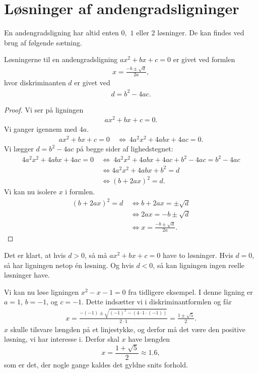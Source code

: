 \section*{Løsninger af andengradsligninger}
En andengradsligning har altid enten $0,$ $1$ eller $2$ løsninger. De kan findes ved brug af følgende sætning.
\begin{setn}
Løsningerne til en andengradsligning $ax^2+bx+c=0$ er givet ved formlen
\begin{align*}
x = \frac{-b\pm \sqrt{d}}{2a},
\end{align*}
hvor diskriminanten $d$ er givet ved
\begin{align*}
d=b^2-4ac.
\end{align*}
\end{setn}
\begin{proof}
Vi ser på ligningen
\begin{align*}
ax^2+bx+c = 0.
\end{align*}
Vi ganger igennem med $4a$.
\begin{align*}
ax^2+bx+c = 0\ &\Leftrightarrow \ 4a^2x^2+4abx+4ac=0.
\end{align*}
Vi lægger $d = b^2-4ac$ på begge sider af lighedstegnet:
\begin{align*}
4a^2x^2+4abx+4ac=0 \ &\Leftrightarrow \ 4a^2x^2+4abx+4ac + b^2-4ac=b^2-4ac\\
&\Leftrightarrow 4a^2x^2+4abx+b^2 = d\\
&\Leftrightarrow (b+2ax)^2 = d.
\end{align*}
Vi kan nu isolere $x$ i formlen.
\begin{align*}
(b+2ax)^2 = d \ &\Leftrightarrow b+2ax = \pm \sqrt{d}\\
&\Leftrightarrow 2ax = -b \pm \sqrt{d}\\
&\Leftrightarrow x = \frac{-b\pm \sqrt{d}}{2a}.
\end{align*}
\end{proof}
Det er klart, at hvis $d>0$, så må $ax^2+bx+c=0$ have to løsninger. Hvis $d=0$, så har ligningen netop én løsning. Og hvis $d<0$, så kan ligningen ingen reelle løsninger have. 
\begin{exa}
Vi kan nu løse ligningen $x^2-x-1=0$ fra tidligere eksempel. I denne ligning er $a=1$, $b=-1$, og $c = -1$. Dette indsætter vi i diskriminantformlen og får
\begin{align*}
x = \frac{-(-1)\pm \sqrt{(-1)^2-(4\cdot 1 \cdot (-1))}}{2\cdot 1} = \frac{1 \pm\sqrt{5}}{2}.
\end{align*}
$x$ skulle tilsvare længden på et linjestykke, og derfor må det være den positive løsning, vi har interesse i. Derfor skal $x$ have længden $$x = \frac{1 +\sqrt{5}}{2}\approx 1.6, $$som er det, der nogle gange kaldes det gyldne snits forhold. 
\end{exa}

